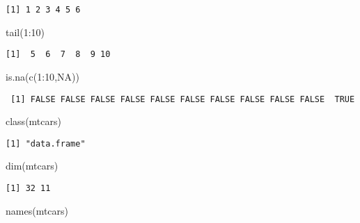 \documentclass[
  letterpaper,
  DIV=11,
  numbers=noendperiod]{scrreprt}
\newenvironment{Shaded}{\begin{snugshade}}{\end{snugshade}}
\newcommand{\ConstantTok}[1]{\textcolor[rgb]{0.56,0.35,0.01}{#1}}
\newcommand{\DecValTok}[1]{\textcolor[rgb]{0.68,0.00,0.00}{#1}}
\newcommand{\FunctionTok}[1]{\textcolor[rgb]{0.28,0.35,0.67}{#1}}
\newcommand{\NormalTok}[1]{\textcolor[rgb]{0.00,0.23,0.31}{#1}}
\newcommand{\SpecialCharTok}[1]{\textcolor[rgb]{0.37,0.37,0.37}{#1}}
\begin{document}
\begin{verbatim}
[1] 1 2 3 4 5 6
\end{verbatim}

\begin{Shaded}
\begin{Highlighting}[]
\FunctionTok{tail}\NormalTok{(}\DecValTok{1}\SpecialCharTok{:}\DecValTok{10}\NormalTok{)}
\end{Highlighting}
\end{Shaded}

\begin{verbatim}
[1]  5  6  7  8  9 10
\end{verbatim}

\begin{Shaded}
\begin{Highlighting}[]
\FunctionTok{is.na}\NormalTok{(}\FunctionTok{c}\NormalTok{(}\DecValTok{1}\SpecialCharTok{:}\DecValTok{10}\NormalTok{,}\ConstantTok{NA}\NormalTok{))}
\end{Highlighting}
\end{Shaded}

\begin{verbatim}
 [1] FALSE FALSE FALSE FALSE FALSE FALSE FALSE FALSE FALSE FALSE  TRUE
\end{verbatim}

\begin{Shaded}
\begin{Highlighting}[]
\FunctionTok{class}\NormalTok{(mtcars)}
\end{Highlighting}
\end{Shaded}

\begin{verbatim}
[1] "data.frame"
\end{verbatim}

\begin{Shaded}
\begin{Highlighting}[]
\FunctionTok{dim}\NormalTok{(mtcars)}
\end{Highlighting}
\end{Shaded}

\begin{verbatim}
[1] 32 11
\end{verbatim}

\begin{Shaded}
\begin{Highlighting}[]
\FunctionTok{names}\NormalTok{(mtcars)}
\end{Highlighting}
\end{Shaded}
\end{document}
